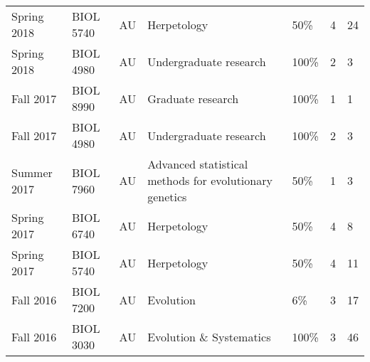 {\begin{longtable}[l]{ p{0.79in} p{0.65in} p{0.60in} p{1.7in} p{0.58in} p{0.34in} p{0.70in} }
    Spring 2018 & BIOL 5740 & AU & Herpetology & 50\% & 4 & 24 \\
    Spring 2018 & BIOL 4980 & AU & Undergraduate research & 100\% & 2 & 3 \\ 
    Fall 2017 & BIOL 8990 & AU & Graduate research & 100\% & 1 & 1 \\ 
    Fall 2017 & BIOL 4980 & AU & Undergraduate research & 100\% & 2 & 3 \\ 
    Summer 2017 & BIOL 7960 & AU & Advanced statistical methods for evolutionary genetics & 50\% & 1 & 3 \\
    Spring 2017 & BIOL 6740 & AU & Herpetology & 50\% & 4 & 8 \\
    Spring 2017 & BIOL 5740 & AU & Herpetology & 50\% & 4 & 11 \\
    Fall 2016 & BIOL 7200 & AU & Evolution & 6\% & 3 & 17 \\
    Fall 2016 & BIOL 3030 & AU & Evolution \& Systematics & 100\% & 3 & 46 \\
\end{longtable}
}
